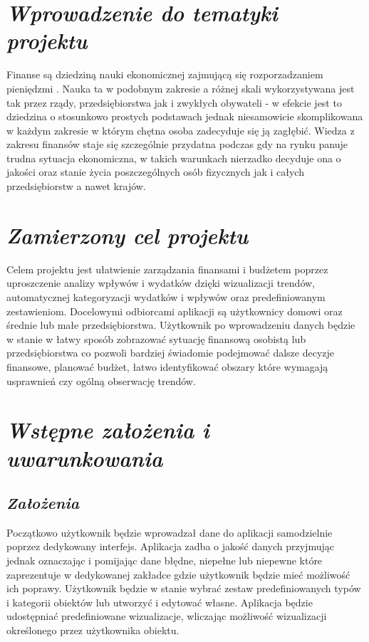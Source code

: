 \documentclass[a4paper,10pt]{report}
\newcommand{\customstylechapter}[1]{\large{\textit{#1}}}
\newcommand{\customstylesection}[1]{\textbf{\textit{#1}}}
\begin{document}
\renewcommand*\contentsname{Spis treści}
\tableofcontents                    %


\chapter{\customstylechapter{Wprowadzenie do tematyki projektu}}
{Finanse są dziedziną nauki ekonomicznej zajmującą się rozporzadzaniem pieniędzmi
 \cite{wiki_ekonomia}. Nauka ta w podobnym zakresie a różnej skali 
wykorzystywana jest tak przez rządy, przedsiębiorstwa jak i zwykłych obywateli - 
w efekcie jest to dziedzina o stosunkowo prostych podstawach jednak niesamowicie
skomplikowana w każdym zakresie w którym chętna osoba zadecyduje się ją zagłębić. 
Wiedza z zakresu finansów staje się szczególnie przydatna podczas gdy na rynku 
panuje trudna sytuacja ekonomiczna, w takich warunkach nierzadko decyduje ona o 
jakości oraz stanie życia poszczególnych osób fizycznych jak i całych 
przedsiębiorstw a nawet krajów.}
%
\chapter{\customstylechapter{Zamierzony cel projektu}}
{Celem projektu jest ułatwienie zarządzania finansami i budżetem poprzez 
uproszczenie analizy wpływów i wydatków dzięki wizualizacji trendów, 
automatycznej kategoryzacji wydatków i wpływów oraz predefiniowanym 
zestawieniom. Docelowymi odbiorcami aplikacji są użytkownicy domowi oraz 
średnie lub małe przedsiębiorstwa. Użytkownik po wprowadzeniu danych będzie 
w stanie w łatwy sposób zobrazować sytuację finansową osobistą lub 
przedsiębiorstwa co pozwoli bardziej świadomie podejmować dalsze decyzje 
finansowe, planować budżet, łatwo identyfikować obszary które wymagają 
usprawnień czy ogólną obserwację trendów.}
%
\chapter{\customstylechapter{Wstępne założenia i uwarunkowania}}
\section{\customstylesection{Założenia}}
{Początkowo użytkownik będzie wprowadzał dane do aplikacji samodzielnie poprzez 
dedykowany interfejs. Aplikacja zadba o jakość danych przyjmując jednak 
oznaczając i pomijając dane błędne, niepełne lub niepewne które zaprezentuje w 
dedykowanej zakładce gdzie użytkownik będzie mieć możliwość ich poprawy. 
Użytkownik będzie w stanie wybrać zestaw predefiniowanych typów i kategorii 
obiektów lub utworzyć i edytować własne. Aplikacja będzie udostępniać 
predefiniowane wizualizacje, wliczając możliwość wizualizacji określonego 
przez użytkownika obiektu.}
%
\end{document}
